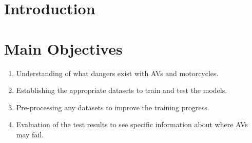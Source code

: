 \documentclass[a0,portrait]{a0poster}
\begin{document}
\begin{multicols}{2} %


	\color{ku} %

	\begin{abstract}

	\end{abstract}


	\color{DarkRed} %

    \section*{Introduction}
       
	

	\color{DarkSlateGray} %

	\section*{Main Objectives}
		\begin{enumerate}
			\item Understanding of what dangers exist with AVs and motorcycles.
			\item Establishing the appropriate datasets to train and test the models.
			\item Pre-processing any datasets to improve the training progress.
			\item Evaluation of the test results to see specific information about where AVs may fail.
		\end{enumerate}



\end{multicols}
\end{document}
